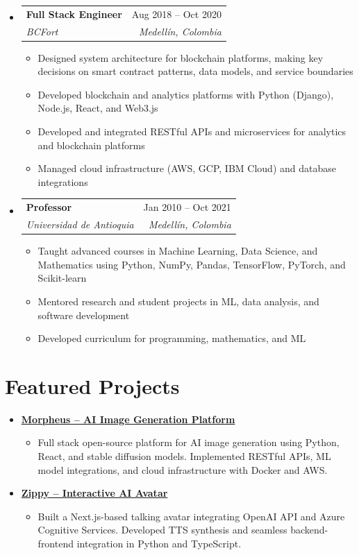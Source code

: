 \documentclass[letterpaper,11pt]{article}
\makeatletter
\newcommand{\resumeSubheading}[4]{
  \vspace{-2pt}
  \item[]
  \begin{tabular*}{\textwidth}{@{\extracolsep{\fill}}l r}
    \textbf{#1} & #2 \\
    \textit{#3} & \textit{#4} \\
  \end{tabular*}
  \vspace{-5pt}
}
\newcommand{\normalfaExternalLink}{{\mdseries\faExternalLink}}
\makeatother
\begin{document}
\begin{itemize}[leftmargin=0pt, itemindent=0pt, label={}, itemsep=1pt]
\resumeSubheading
{Full Stack Engineer}{Aug 2018 -- Oct 2020}
{BCFort}{Medellín, Colombia}
\begin{itemize}[leftmargin=*, itemsep=0pt]
    \item Designed system architecture for blockchain platforms, making key decisions on smart contract patterns, data models, and service boundaries
    \item Developed blockchain and analytics platforms with Python (Django), Node.js, React, and Web3.js
    \item Developed and integrated RESTful APIs and microservices for analytics and blockchain platforms
    \item Managed cloud infrastructure (AWS, GCP, IBM Cloud) and database integrations
\end{itemize}

\resumeSubheading
{Professor}{Jan 2010 -- Oct 2021}
{Universidad de Antioquia}{Medellín, Colombia}
\begin{itemize}[leftmargin=*, itemsep=0pt]
    \item Taught advanced courses in Machine Learning, Data Science, and Mathematics using Python, NumPy, Pandas, TensorFlow, PyTorch, and Scikit-learn
    \item Mentored research and student projects in ML, data analysis, and software development
    \item Developed curriculum for programming, mathematics, and ML
\end{itemize}
\end{itemize}

\section{Featured Projects}
\begin{itemize}[leftmargin=*, itemsep=1pt]
    \item \textbf{\href{https://github.com/Monadical-SAS/Morpheus}{Morpheus -- AI Image Generation Platform \normalfaExternalLink}}
    \begin{itemize}[itemsep=0pt]
        \item Full stack open-source platform for AI image generation using Python, React, and stable diffusion models. Implemented RESTful APIs, ML model integrations, and cloud infrastructure with Docker and AWS.
    \end{itemize}
    \item \textbf{\href{https://github.com/asanchezyali/ai-avatar}{Zippy -- Interactive AI Avatar \normalfaExternalLink}}
    \begin{itemize}[itemsep=0pt]
        \item Built a Next.js-based talking avatar integrating OpenAI API and Azure Cognitive Services. Developed TTS synthesis and seamless backend-frontend integration in Python and TypeScript.
    \end{itemize}
\end{itemize}
\end{document}
